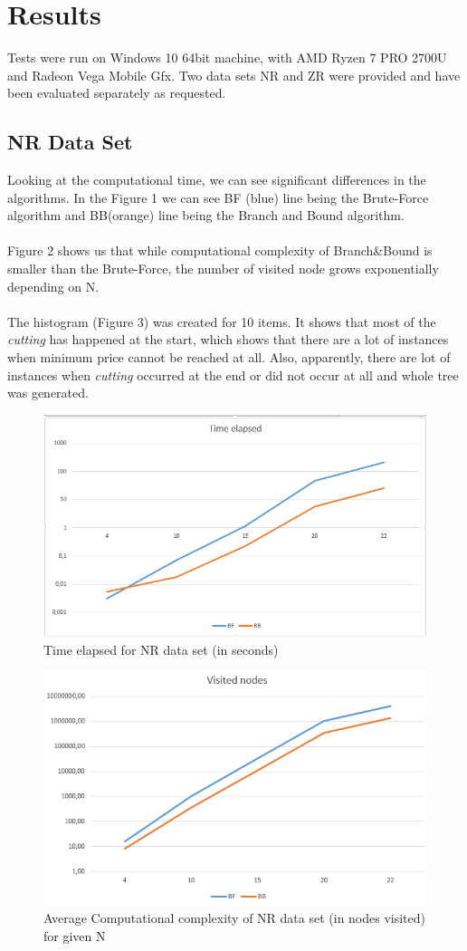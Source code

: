 \documentclass{article}
\begin{document}
\section{Results}
Tests were run on Windows 10 64bit machine, with AMD Ryzen 7 PRO 2700U and Radeon Vega Mobile Gfx. Two data sets NR and ZR were provided and have been evaluated separately as requested.

\subsection{NR Data Set}
Looking at the computational time, we can see significant differences in the algorithms. In the Figure 1 we can see BF (blue) line being the Brute-Force algorithm and BB(orange) line being the Branch and Bound algorithm.
\\
\\
Figure 2 shows us that while computational complexity of Branch\&Bound is smaller than the Brute-Force, the number of visited node grows exponentially depending on N. 
\\
\\
The histogram (Figure 3) was created for 10 items. It shows that most of the \textit{cutting} has happened at the start, which shows that there are a lot of instances when minimum price cannot be reached at all. Also, apparently, there are lot of instances when \textit{cutting} occurred at the end or did not occur at all and whole tree was generated.
\begin{figure}[H]
    \centering
    \includegraphics[width=0.8\linewidth]{NRtime.PNG}
    \caption{Time elapsed for NR data set (in seconds)}
\end{figure}
\begin{figure}[H]
    \centering
    \includegraphics[width=0.8\linewidth]{NRpass.PNG}
    \caption{Average Computational complexity of NR data set (in nodes visited) for given N}
\end{figure}
\end{document}
